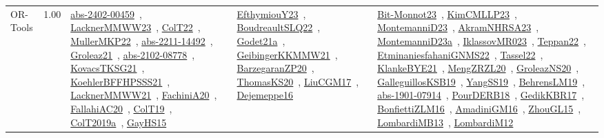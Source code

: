 {\begin{longtable}{p{3cm}r>{\raggedright\arraybackslash}p{6cm}>{\raggedright\arraybackslash}p{6cm}>{\raggedright\arraybackslash}p{8cm}}
\index{OR-Tools}\index{CPSystems!OR-Tools}OR-Tools &  1.00 & \href{../works/abs-2402-00459.pdf}{abs-2402-00459}~\cite{abs-2402-00459}, \href{../works/LacknerMMWW23.pdf}{LacknerMMWW23}~\cite{LacknerMMWW23}, \href{../works/ColT22.pdf}{ColT22}~\cite{ColT22}, \href{../works/MullerMKP22.pdf}{MullerMKP22}~\cite{MullerMKP22}, \href{../works/abs-2211-14492.pdf}{abs-2211-14492}~\cite{abs-2211-14492}, \href{../works/Groleaz21.pdf}{Groleaz21}~\cite{Groleaz21}, \href{../works/abs-2102-08778.pdf}{abs-2102-08778}~\cite{abs-2102-08778}, \href{../works/KovacsTKSG21.pdf}{KovacsTKSG21}~\cite{KovacsTKSG21}, \href{../works/KoehlerBFFHPSSS21.pdf}{KoehlerBFFHPSSS21}~\cite{KoehlerBFFHPSSS21}, \href{../works/LacknerMMWW21.pdf}{LacknerMMWW21}~\cite{LacknerMMWW21}, \href{../works/FachiniA20.pdf}{FachiniA20}~\cite{FachiniA20}, \href{../works/FallahiAC20.pdf}{FallahiAC20}~\cite{FallahiAC20}, \href{../works/ColT19.pdf}{ColT19}~\cite{ColT19}, \href{../works/ColT2019a.pdf}{ColT2019a}~\cite{ColT2019a}, \href{../works/GayHS15.pdf}{GayHS15}~\cite{GayHS15} & \href{../works/EfthymiouY23.pdf}{EfthymiouY23}~\cite{EfthymiouY23}, \href{../works/BoudreaultSLQ22.pdf}{BoudreaultSLQ22}~\cite{BoudreaultSLQ22}, \href{../works/Godet21a.pdf}{Godet21a}~\cite{Godet21a}, \href{../works/GeibingerKKMMW21.pdf}{GeibingerKKMMW21}~\cite{GeibingerKKMMW21}, \href{../works/BarzegaranZP20.pdf}{BarzegaranZP20}~\cite{BarzegaranZP20}, \href{../works/ThomasKS20.pdf}{ThomasKS20}~\cite{ThomasKS20}, \href{../works/LiuCGM17.pdf}{LiuCGM17}~\cite{LiuCGM17}, \href{../works/Dejemeppe16.pdf}{Dejemeppe16}~\cite{Dejemeppe16} & \href{../works/Bit-Monnot23.pdf}{Bit-Monnot23}~\cite{Bit-Monnot23}, \href{../works/KimCMLLP23.pdf}{KimCMLLP23}~\cite{KimCMLLP23}, \href{../works/MontemanniD23.pdf}{MontemanniD23}~\cite{MontemanniD23}, \href{../works/AkramNHRSA23.pdf}{AkramNHRSA23}~\cite{AkramNHRSA23}, \href{../works/MontemanniD23a.pdf}{MontemanniD23a}~\cite{MontemanniD23a}, \href{../works/IklassovMR023.pdf}{IklassovMR023}~\cite{IklassovMR023}, \href{../works/Teppan22.pdf}{Teppan22}~\cite{Teppan22}, \href{../works/EtminaniesfahaniGNMS22.pdf}{EtminaniesfahaniGNMS22}~\cite{EtminaniesfahaniGNMS22}, \href{../works/Tassel22.pdf}{Tassel22}~\cite{Tassel22}, \href{../works/KlankeBYE21.pdf}{KlankeBYE21}~\cite{KlankeBYE21}, \href{../works/MengZRZL20.pdf}{MengZRZL20}~\cite{MengZRZL20}, \href{../works/GroleazNS20.pdf}{GroleazNS20}~\cite{GroleazNS20}, \href{../works/GalleguillosKSB19.pdf}{GalleguillosKSB19}~\cite{GalleguillosKSB19}, \href{../works/YangSS19.pdf}{YangSS19}~\cite{YangSS19}, \href{../works/BehrensLM19.pdf}{BehrensLM19}~\cite{BehrensLM19}, \href{../works/abs-1901-07914.pdf}{abs-1901-07914}~\cite{abs-1901-07914}, \href{../works/PourDERB18.pdf}{PourDERB18}~\cite{PourDERB18}, \href{../works/GedikKBR17.pdf}{GedikKBR17}~\cite{GedikKBR17}, \href{../works/BonfiettiZLM16.pdf}{BonfiettiZLM16}~\cite{BonfiettiZLM16}, \href{../works/AmadiniGM16.pdf}{AmadiniGM16}~\cite{AmadiniGM16}, \href{../works/ZhouGL15.pdf}{ZhouGL15}~\cite{ZhouGL15}, \href{../works/LombardiMB13.pdf}{LombardiMB13}~\cite{LombardiMB13}, \href{../works/LombardiM12.pdf}{LombardiM12}~\cite{LombardiM12}\\

\end{longtable}}
